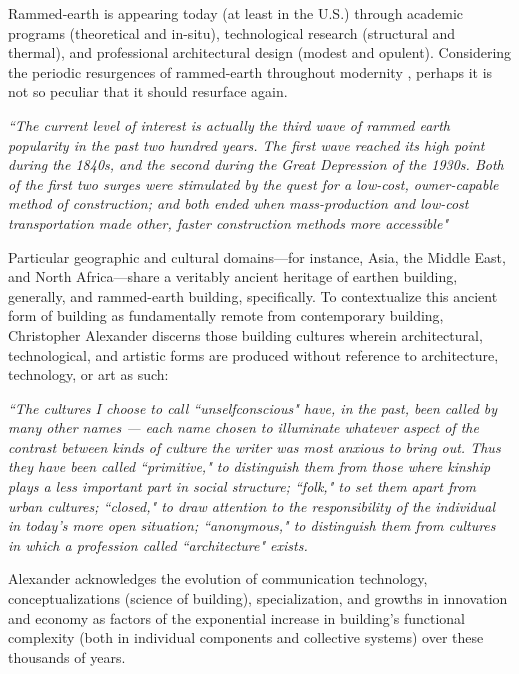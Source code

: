 Rammed-earth is appearing today (at least in the U.S.) through academic programs (theoretical and in-situ), technological research (structural and thermal), and professional architectural design (modest and opulent). Considering the periodic resurgences of rammed-earth throughout modernity \cite{RAMMEDEARTHHOUSE}, perhaps it is not so peculiar that it should resurface again.

\begin{flushright}
\small{
\textit{
``The current level of interest is actually the third wave of rammed earth popularity in the past two hundred years. The first wave reached its high point during the 1840s, and the second during the Great Depression of the 1930s. Both of the first two surges were stimulated by the quest for a low-cost, owner-capable method of construction; and both ended when mass-production and low-cost transportation made other, faster construction methods more accessible"}} \cite[p11, 12]{RAMMEDEARTHHOUSE}
\end{flushright}

Particular geographic and cultural domains---for instance, Asia, the Middle East, and North Africa---share a veritably ancient heritage of earthen building, generally, and rammed-earth building, specifically. \cite{RAMMEDEARTHHOUSE} To contextualize this ancient form of building as fundamentally remote from contemporary building, Christopher Alexander discerns those building cultures wherein architectural, technological, and artistic forms are produced without reference to architecture, technology, or art as such:

\begin{flushright}
\small{
\textit{
``The cultures I choose to call ``unselfconscious" have, in the past, been called by many other names --- each name chosen to illuminate whatever aspect of the contrast between kinds of culture the writer was most anxious to bring out. Thus they have been called ``primitive," to distinguish them from those where kinship plays a less important part in social structure; ``folk," to set them apart from urban cultures; ``closed," to draw attention to the responsibility of the individual in today's more open situation; ``anonymous," to distinguish them from cultures in which a profession called ``architecture" exists.}} \cite[p33]{SYNOFFORM}
\end{flushright}

Alexander acknowledges the evolution of communication technology, conceptualizations (science of building), specialization, and growths in innovation and economy \cite[p33,34]{SYNOFFORM} as factors of the exponential increase in building's functional complexity (both in individual components and collective systems) over these thousands of years.

